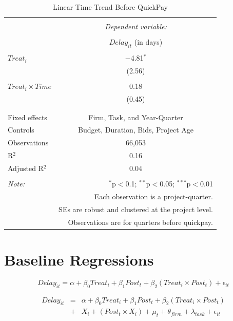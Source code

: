 \documentclass[
]{article}
\begin{document}
\begin{table}[H] \centering 
  \caption{Linear Time Trend Before QuickPay} 
  \label{} 
\small 
\begin{tabular}{@{\extracolsep{5pt}}lc} 
\\[-1.8ex]\hline 
\hline \\[-1.8ex] 
 & \multicolumn{1}{c}{\textit{Dependent variable:}} \\ 
\cline{2-2} 
\\[-1.8ex] & $Delay_{it}$ (in days) \\ 
\hline \\[-1.8ex] 
 $Treat_i$ & $-$4.81$^{*}$ \\ 
  & (2.56) \\ 
  & \\ 
 $Treat_i \times Time$ & 0.18 \\ 
  & (0.45) \\ 
  & \\ 
\hline \\[-1.8ex] 
Fixed effects & Firm, Task, and Year-Quarter \\ 
Controls & Budget, Duration, Bids, Project Age \\ 
Observations & 66,053 \\ 
R$^{2}$ & 0.16 \\ 
Adjusted R$^{2}$ & 0.04 \\ 
\hline 
\hline \\[-1.8ex] 
\textit{Note:}  & \multicolumn{1}{r}{$^{*}$p$<$0.1; $^{**}$p$<$0.05; $^{***}$p$<$0.01} \\ 
 & \multicolumn{1}{r}{Each observation is a project-quarter.} \\ 
 & \multicolumn{1}{r}{SEs are robust and clustered at the project level.} \\ 
 & \multicolumn{1}{r}{Observations are for quarters before quickpay.} \\ 
\end{tabular} 
\end{table}

\hypertarget{baseline-regressions}{%
\section{Baseline Regressions}\label{baseline-regressions}}

\[ Delay_{it} = \alpha+\beta_0 Treat_i + \beta_1 Post_t + \beta_2 (Treat_i \times Post_t) + \epsilon_{it}\]

\[ \begin{aligned} Delay_{it} &=& \alpha+\beta_0 Treat_i + \beta_1 Post_t + \beta_2 (Treat_i \times Post_t)\\
&+&  X_i + (Post_t \times X_i) + \mu_t + \theta_{firm} + \lambda_{task}+ \epsilon_{it}
\end{aligned}\]
\end{document}

